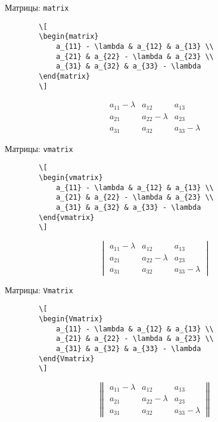 \begin{frame}[fragile]{Матрицы: \texttt{matrix}}
	\begin{verbatim}
		\[
		\begin{matrix}
			a_{11} - \lambda & a_{12} & a_{13} \\
			a_{21} & a_{22} - \lambda & a_{23} \\
			a_{31} & a_{32} & a_{33} - \lambda
		\end{matrix}
		\]
	\end{verbatim}
	\Large
	\[
	\begin{matrix}
		a_{11} - \lambda & a_{12} & a_{13} \\
		a_{21} & a_{22} - \lambda & a_{23} \\
		a_{31} & a_{32} & a_{33} - \lambda
	\end{matrix}
	\]
\end{frame}

\begin{frame}[fragile]{Матрицы: \texttt{vmatrix}}
	\begin{verbatim}
		\[
		\begin{vmatrix}
			a_{11} - \lambda & a_{12} & a_{13} \\
			a_{21} & a_{22} - \lambda & a_{23} \\
			a_{31} & a_{32} & a_{33} - \lambda
		\end{vmatrix}
		\]
	\end{verbatim}
	\Large
	\[
	\begin{vmatrix}
		a_{11} - \lambda & a_{12} & a_{13} \\
		a_{21} & a_{22} - \lambda & a_{23} \\
		a_{31} & a_{32} & a_{33} - \lambda
	\end{vmatrix}
	\]
\end{frame}

\begin{frame}[fragile]{Матрицы: \texttt{Vmatrix}}
	\begin{verbatim}
		\[
		\begin{Vmatrix}
			a_{11} - \lambda & a_{12} & a_{13} \\
			a_{21} & a_{22} - \lambda & a_{23} \\
			a_{31} & a_{32} & a_{33} - \lambda
		\end{Vmatrix}
		\]
	\end{verbatim}
	\Large
	\[
	\begin{Vmatrix}
		a_{11} - \lambda & a_{12} & a_{13} \\
		a_{21} & a_{22} - \lambda & a_{23} \\
		a_{31} & a_{32} & a_{33} - \lambda
	\end{Vmatrix}
	\]
\end{frame}

